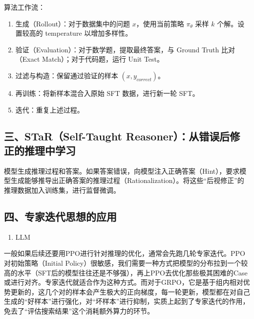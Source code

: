 算法工作流：

\begin{enumerate}
\def\labelenumi{\arabic{enumi}.}
\tightlist
\item
  生成（Rollout）：对于数据集中的问题 \(x\)，使用当前策略 \(\pi_\theta\) 采样 \(k\) 个解。设置较高的 temperature 以增加多样性。
\item
  验证（Evaluation）：对于数学题，提取最终答案，与 Ground Truth 比对（Exact Match）；对于代码题，运行 Unit Test。
\item
  过滤与构造：保留通过验证的样本 \((x,y_{correct})\)。
\item
  再训练：将新样本混合入原始 SFT 数据，进行新一轮 SFT。
\item
  迭代：重复上述过程。
\end{enumerate}

\hypertarget{ux4e09starself-taught-reasonerux4eceux9519ux8befux540eux4feeux6b63ux7684ux63a8ux7406ux4e2dux5b66ux4e60}{%
\subsection{三、STaR（Self-Taught Reasoner）：从错误后修正的推理中学习}\label{ux4e09starself-taught-reasonerux4eceux9519ux8befux540eux4feeux6b63ux7684ux63a8ux7406ux4e2dux5b66ux4e60}}

模型生成推理过程和答案。如果答案错误，向模型注入正确答案（Hint），要求模型生成能够推导出正确答案的推理过程（Rationalization）。将这些``后视修正''的推理数据加入训练集，进行监督微调。

\hypertarget{ux56dbux4e13ux5bb6ux8fedux4ee3ux601dux60f3ux7684ux5e94ux7528}{%
\subsection{四、专家迭代思想的应用}\label{ux56dbux4e13ux5bb6ux8fedux4ee3ux601dux60f3ux7684ux5e94ux7528}}

\begin{enumerate}
\def\labelenumi{\arabic{enumi}.}
\tightlist
\item
  LLM
\end{enumerate}

一般如果后续还要用PPO进行针对推理的优化，通常会先跑几轮专家迭代。PPO对初始策略（Initial Policy）很敏感，我们需要一种方式把模型的分布拉到一个较高的水平（SFT后的模型往往还是不够强），再上PPO去优化那些极其困难的Case或进行对齐。专家迭代就适合作为这种方式。而对于GRPO，它是基于组内相对优势更新的，这几个对的样本会产生极大的正向梯度，每一轮更新，模型都在对自己生成的``好样本''进行强化，对``坏样本''进行抑制，实质上起到了专家迭代的作用，免去了``评估搜索结果''这个消耗额外算力的环节。

